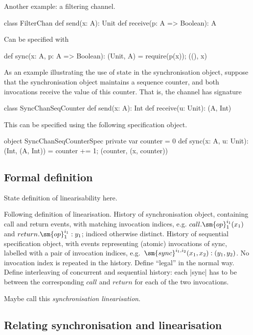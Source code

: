 \documentclass[12pt,a4paper]{article}
\begin{document}
Another example: a filtering channel.
\begin{scala}
class FilterChan{
  def send(x: A): Unit
  def receive(p: A => Boolean): A
}
\end{scala}
Can be specified with
\begin{scala}
  def sync(x: A, p: A => Boolean): (Unit, A) = { require(p(x)); ((), x) }
\end{scala}

As an example illustrating the use of state in the synchronisation object,
suppose that the synchronisation object maintains a sequence counter, and both
invocations receive the value of this counter.  That is, the channel has
signature 
\begin{scala}
class SyncChanSeqCounter{
  def send(x: A): Int
  def receive(u: Unit): (A, Int)
}
\end{scala}
%
This can be specified using the following specification object.
%
\begin{scala}
object SyncChanSeqCounterSpec{
  private var counter = 0
  def sync(x: A, u: Unit): (Int, (A, Int)) = {
    counter += 1; (counter, (x, counter))
  }
}
\end{scala}


\subsection*{Formal definition}

State definition of linearisability here. 

Following definition of linearisation.  History of synchronisation object,
containing call and return events, with matching invocation indices,
e.g. $call.\sm{op}_1^{i_1}(x_1)$ and $return.\sm{op}_1^{i_1}: y_1$; indiced
otherwise distinct.  History of sequential specification object, with events
representing (atomic) invocations of sync, labelled with a pair of invocation
indices, e.g.~$\sm{sync}^{i_1, i_2}(x_1, x_2): (y_1, y_2)$.  No invocation
index is repeated in the history.  Define ``legal'' in the normal way.  Define
interleaving of concurrent and sequential history: each |sync| has to be
between the corresponding $call$ and $return$ for each of the two invocations.

Maybe call this \emph{synchronisation linearisation}. 



\subsection*{Relating synchronisation and linearisation}
\end{document}

